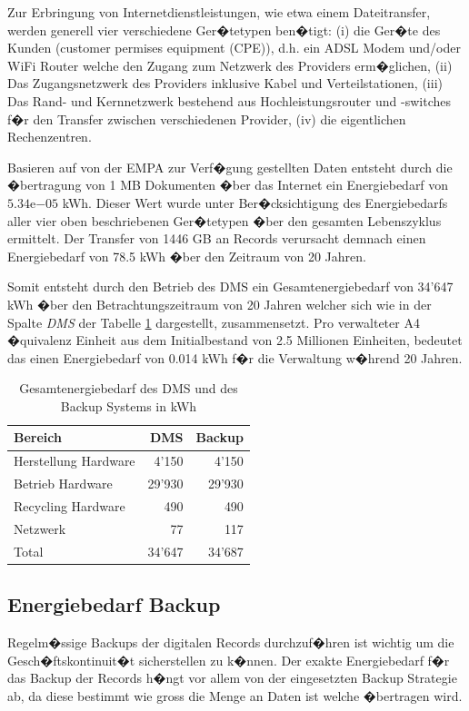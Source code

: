 \documentclass[a4paper,twoside,10pt]{report}
\begin{document}
Zur Erbringung von Internetdienstleistungen, wie etwa einem Dateitransfer, werden generell vier verschiedene Ger�tetypen ben�tigt: (i) die Ger�te des Kunden (customer permises equipment (CPE)), d.h. ein ADSL Modem und/oder WiFi Router welche den Zugang zum Netzwerk des Providers erm�glichen, (ii) Das Zugangsnetzwerk des Providers inklusive Kabel und Verteilstationen, (iii) Das Rand- und Kernnetzwerk bestehend aus Hochleistungsrouter und -switches f�r den Transfer zwischen verschiedenen Provider, (iv) die eigentlichen Rechenzentren. \cite{icthardware}

Basieren auf von der \ac{EMPA} zur Verf�gung gestellten Daten entsteht durch die �bertragung von 1 MB Dokumenten �ber das Internet ein Energiebedarf von $5.34\mathrm{e}{-05}$ kWh. Dieser Wert wurde unter Ber�cksichtigung des Energiebedarfs aller vier oben beschriebenen Ger�tetypen �ber den gesamten Lebenszyklus ermittelt. Der Transfer von 1446 GB an Records verursacht demnach einen Energiebedarf von 78.5 kWh �ber den Zeitraum von 20 Jahren. \cite{empa_daten}

Somit entsteht durch den Betrieb des \ac{DMS} ein Gesamtenergiebedarf von 34'647 kWh �ber den Betrachtungszeitraum von 20 Jahren welcher sich wie in der Spalte \emph{DMS} der Tabelle \ref{tab:ges_energ_dms} dargestellt, zusammensetzt. Pro verwalteter A4 �quivalenz Einheit aus dem Initialbestand von 2.5 Millionen Einheiten, bedeutet das einen Energiebedarf von 0.014 kWh f�r die Verwaltung w�hrend 20 Jahren.

\begin{table} [h]
	\begin{tabular}{l|r|r}
	\hline
	\textbf{Bereich} & \textbf{DMS} & \textbf{Backup}\\
	\hline
	Herstellung Hardware & 4'150  & 4'150 \\
	Betrieb Hardware &	29'930 & 29'930\\
	Recycling Hardware & 490 & 490\\
	Netzwerk	& 77  & 117\\
	\hline
	\hline
	Total  & 34'647 & 34'687 \\
	\hline
	\end{tabular}
\caption{Gesamtenergiebedarf des \ac{DMS} und des Backup Systems in kWh} 
\label{tab:ges_energ_dms}
\end{table}
 

\subsection{Energiebedarf Backup}
Regelm�ssige Backups der digitalen Records durchzuf�hren ist wichtig um die Gesch�ftskontinuit�t sicherstellen zu k�nnen. Der exakte Energiebedarf f�r das Backup der Records h�ngt vor allem von der eingesetzten Backup Strategie ab, da diese bestimmt wie gross die Menge an Daten ist welche �bertragen wird. \cite{disaster} 
\end{document}

